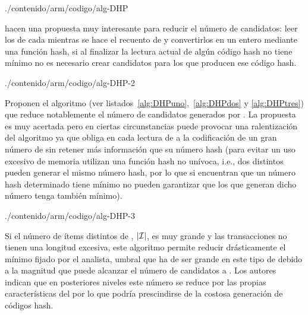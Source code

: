

                 {./contenido/arm/codigo/alg-DHP}                 

\citet{ParkChenYu-AnEffectiveHashBasedAlgorithmForARM-1995} hacen una propuesta muy interesante para reducir el número de candidatos: leer los \kitemsets[(k+1)] de cada \transaccion mientras se hace el recuento de \aprioriC y convertirlos en un entero mediante una función hash, si al finalizar la lectura actual de \D algún código hash no tiene \soporte mínimo no es necesario crear candidatos para los \kitemsets[(k+1)] que producen ese código hash.


                 {./contenido/arm/codigo/alg-DHP-2}

Proponen el algoritmo  (ver listados~\ref{alg:DHPuno},~\ref{alg:DHPdos} y \ref{alg:DHPtres}) que reduce notablemente el número de candidatos generados por \apriori. La propuesta es muy acertada pero en ciertas circunstancias puede provocar una ralentización del algoritmo ya que obliga en cada lectura de \D a la codificación de un gran número de \kitemsets[(k+1)] sin retener más información que su número hash (para evitar un uso excesivo de memoria utilizan una función hash no unívoca, i.e., dos \kitemsets[(k+1)] distintos pueden generar el mismo número hash, por lo que si encuentran que un número hash determinado tiene \soporte mínimo no pueden garantizar que los \itemsets que generan dicho número tenga también \soporte mínimo).


                 {./contenido/arm/codigo/alg-DHP-3}

Si el número de ítems distintos de \D, $|\I|$, es muy grande y las transacciones no tienen una longitud excesiva, este algoritmo permite reducir drásticamente el \soporte mínimo fijado por el analista, umbral que ha de ser grande en este tipo de \datasets debido a la magnitud que puede alcanzar el número de candidatos a \kitemsets[2]. Los autores indican que en posteriores niveles este número se reduce por las propias características del \dataset por lo que podría prescindirse de la costosa generación de códigos hash.

